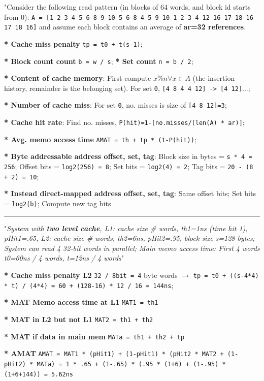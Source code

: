\documentclass[a4paper]{article}
\begin{document}
\begin{multicols*}{2}
  "Consider the following read pattern (in blocks of 64 words, and block id starts from 0):
  \texttt{A = [1 2 3 4 5 6 8 9 10 5 6 8 4 5 9 10 1 2 3 4 12 16 17 18 16 17 18 16]}
  and assume each block contains an average of \textbf{ar=32 references}.

  \textbf{* Cache miss penalty} \texttt{tp = t0 + t(s-1)};

  \textbf{* Block count count} \texttt{b = w / s};
  \textbf{* Set count} \texttt{n = b / 2};

  \textbf{* Content of cache memory}: First compute $x\%n \forall x \in A$ (the insertion history, remainder is the belonging set). For set \texttt{0}, \texttt{[4 8 4 4 12] -> [4 12]}...;

  \textbf{* Number of cache miss}: For set \texttt{0}, no. misses is size of \texttt{[4 8 12]=3};

  \textbf{* Cache hit rate}: Find no. misses, \texttt{P(hit)=1-[no.misses/(len(A) * ar)]};

  \textbf{* Avg. memo access time} \texttt{AMAT = th + tp * (1-P(hit))};

  \textbf{* Byte addressable address offset, set, tag}: Block size in bytes = \texttt{s * 4 = 256}; Offset bits = \texttt{log2(256) = 8}; Set bits = \texttt{log2(4) = 2}; Tag bits = \texttt{20 - (8 + 2) = 10};

  \textbf{* Instead direct-mapped address offset, set, tag}: Same offset bits; Set bits = \texttt{log2(b)}; Compute new tag bits

  \rule{1\linewidth}{0.4pt}

  "\textit{System with \textbf{two level cache}, L1: cache size \# words, th1=1ns (time hit 1), pHit1=.65, L2: cache size \# words, th2=6ns, pHit2=.95, block size s=128 bytes; System can read 4 32-bit words in parallel; Main memo access time: First 4 words t0=60ns / 4 words, t=12ns / 4 words}"

  \textbf{* Cache miss penalty L2} \texttt{32 / 8bit = 4} byte words $\to$ \texttt{tp = t0 + ((s-4*4) * t) / (4*4) = 60 + (128-16) * 12 / 16 = 144ns};

  \textbf{* MAT Memo access time at L1} \texttt{MAT1 = th1}

  \textbf{* MAT in L2 but not L1} \texttt{MAT2 = th1 + th2}

  \textbf{* MAT if data in main mem} \texttt{MATa = th1 + th2 + tp}

  \textbf{* AMAT} \texttt{AMAT = MAT1 * (pHit1) + (1-pHit1) * (pHit2 * MAT2 + (1-pHit2) * MATa) = 1 * .65 + (1-.65) * (.95 * (1+6) + (1-.95) * (1+6+144)) = 5.62ns}


\end{multicols*}
\end{document}
